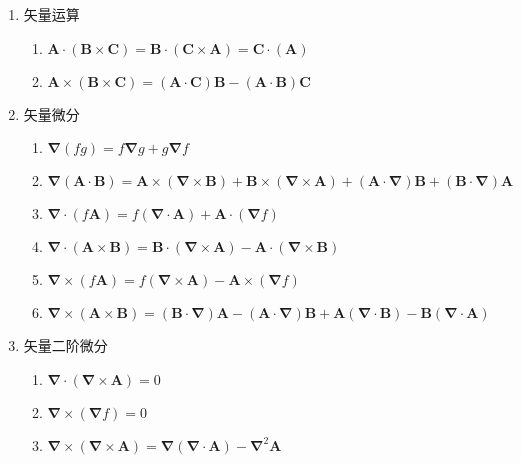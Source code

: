 \documentclass{report}
\begin{document}
    \begin{enumerate}[label = \chinese*、]
        \item 矢量运算
        \begin{enumerate}[label = (\arabic*)]
            \item \(\boldsymbol{A}\cdot(\boldsymbol{B}\times\boldsymbol{C})=\boldsymbol{B}\cdot(\boldsymbol{C}\times\boldsymbol{A})=\boldsymbol{C}\cdot(\boldsymbol{A})\)
            \item \(\boldsymbol{A}\times(\boldsymbol{B}\times\boldsymbol{C})=(\boldsymbol{A}\cdot\boldsymbol{C})\boldsymbol{B}-(\boldsymbol{A}\cdot\boldsymbol{B})\boldsymbol{C}\)
        \end{enumerate}
        \item 矢量微分
        \begin{enumerate}[label = (\arabic*)]
            \item \(\boldsymbol{\nabla}(fg)=f\boldsymbol{\nabla}g+g\boldsymbol{\nabla}f\)
            \item \(\boldsymbol{\nabla}(\boldsymbol{A}\cdot\boldsymbol{B})=\boldsymbol{A}\times(\boldsymbol{\nabla}\times\boldsymbol{B})+\boldsymbol{B}\times(\boldsymbol{\nabla}\times\boldsymbol{A})+(\boldsymbol{A}\cdot\boldsymbol{\nabla})\boldsymbol{B}+(\boldsymbol{B}\cdot\boldsymbol{\nabla})\boldsymbol{A}\)
            \item \(\boldsymbol{\nabla}\cdot(f\boldsymbol{A})=f(\boldsymbol{\nabla}\cdot \boldsymbol{A})+\boldsymbol{A}\cdot(\boldsymbol{\nabla}f)\)
            \item \(\boldsymbol{\nabla}\cdot(\boldsymbol{A}\times\boldsymbol{B})=\boldsymbol{B}\cdot(\boldsymbol{\nabla}\times\boldsymbol{A})-\boldsymbol{A}\cdot(\boldsymbol{\nabla}\times\boldsymbol{B})\)
            \item \(\boldsymbol{\nabla}\times(f\boldsymbol{A})=f(\boldsymbol{\nabla}\times\boldsymbol{A})-\boldsymbol{A}\times(\boldsymbol{\nabla}f)\)
            \item \(\boldsymbol{\nabla}\times(\boldsymbol{A}\times\boldsymbol{B})=(\boldsymbol{B}\cdot\boldsymbol{\nabla})\boldsymbol{A}-(\boldsymbol{A}\cdot\boldsymbol{\nabla})\boldsymbol{B}+\boldsymbol{A}(\boldsymbol{\nabla}\cdot\boldsymbol{B})-\boldsymbol{B}(\boldsymbol{\nabla}\cdot\boldsymbol{A})\)
        \end{enumerate}
        \item 矢量二阶微分
        \begin{enumerate}
            \item \(\boldsymbol{\nabla}\cdot(\boldsymbol{\nabla}\times\boldsymbol{A})=0\)
            \item \(\boldsymbol{\nabla}\times(\boldsymbol{\nabla}f)=0\)
            \item \(\boldsymbol{\nabla}\times(\boldsymbol{\nabla}\times\boldsymbol{A})=\boldsymbol{\nabla}(\boldsymbol{\nabla}\cdot\boldsymbol{A})-\boldsymbol{\nabla}^2\boldsymbol{A}\)
        \end{enumerate}
    \end{enumerate}
\end{document}

